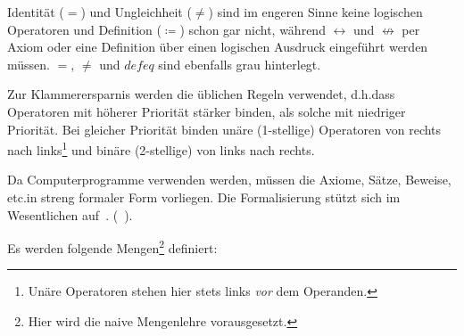 \documentclass[english,ngerman,parskip=half,headsepline,footsepline]{scrreprt}
\newcommand{\lequiv}{\operatorname{\leftrightarrow}}   %
\newcommand{\lnequiv}{\operatorname{\nleftrightarrow}} %
\newcommand{\defeq}{\coloneqq}
\begin{document}
	Identität ($=$) und Ungleichheit  ($\ne$) sind im engeren Sinne keine logischen Operatoren und Definition ($\defeq$) schon gar nicht, während $\lequiv$ und $\lnequiv$ per Axiom oder eine Definition über einen logischen Ausdruck eingeführt werden müssen. $=$, $\ne$ und $defeq$ sind ebenfalls grau hinterlegt.

	Zur Klammerersparnis werden die üblichen Regeln verwendet, d.\@ h.\@ dass Operatoren mit höherer Priorität stärker binden, als solche mit niedriger Priorität. Bei gleicher Priorität binden unäre (1-stellige) Operatoren von rechts nach links\footnote{ Unäre Operatoren stehen hier stets links \emph{vor} dem Operanden.} und binäre (2-stellige) von links nach rechts.

	Da Computerprogramme verwenden werden, müssen die Axiome, Sätze, Beweise, etc.\@ in streng formaler Form vorliegen. Die Formalisierung stützt sich im Wesentlichen auf~\cite{bib:Aussagenlogik}. (\alsoname~\cite{bib:LogikDe, bib:LogikEn}).


	Es werden folgende Mengen\footnote{ Hier wird die naive Mengenlehre vorausgesetzt.} definiert:
\end{document}
